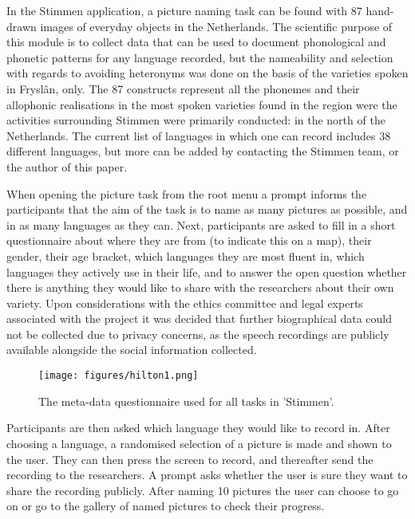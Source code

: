\documentclass[output=paper,hidelinks]{langscibook}
\begin{document}
In the Stimmen application, a picture naming task can be found with 87 hand-drawn images of everyday objects in the Netherlands. The scientific purpose of this module is to collect data that can be used to document phonological and phonetic patterns for any language recorded, but the nameability and selection with regards to avoiding heteronyms was done on the basis of the varieties spoken in Fryslân, only. The 87 constructs represent all the phonemes and their allophonic realisations in the most spoken varieties found in the region were the activities surrounding Stimmen were primarily conducted: in the north of the Netherlands. The current list of languages in which one can record includes 38 different languages, but more can be added by contacting the Stimmen team, or the author of this paper.

When opening the picture task from the root menu a prompt informs the participants that the aim of the task is to name as many pictures as possible, and in as many languages as they can. Next, participants are asked to fill in a short questionnaire about where they are from (to indicate this on a map), their gender, their age bracket, which languages they are most fluent in, which languages they actively use in their life, and to answer the open question whether there is anything they would like to share with the researchers about their own variety. Upon considerations with the ethics committee and legal experts associated with the project it was decided that further biographical data could not be collected due to privacy concerns, as the speech recordings are publicly available alongside the social information collected. 


\begin{figure}
  \texttt{[image: figures/hilton1.png]}
  \caption{The meta-data questionnaire used for all tasks in 'Stimmen'.}
 \label{fig:hilton:1}
\end{figure}

Participants are then asked which language they would like to record in. After choosing a language, a randomised selection of a picture is made and shown to the user. They can then press the screen to record, and thereafter send the recording to the researchers. A prompt asks whether the user is sure they want to share the recording publicly. After naming 10 pictures the user can choose to go on or go to the gallery of named pictures to check their progress. 
\end{document}
